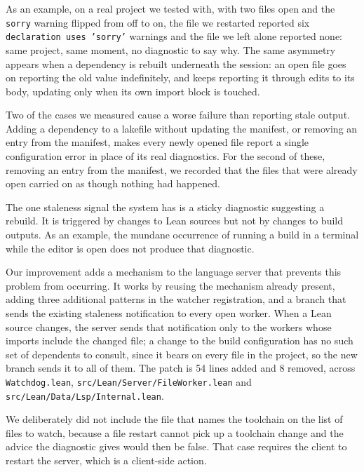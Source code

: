 \documentclass{article}
\newcommand{\Lean}{Lean\xspace}      %
\begin{document}
As an example, on a real project we tested with, with two files open and the \texttt{sorry} warning flipped from off to on, the file we restarted reported six \texttt{declaration uses 'sorry'} warnings and the file we left alone reported none: same project, same moment, no diagnostic to say why. The same asymmetry appears when a dependency is rebuilt underneath the session: an open file goes on reporting the old value indefinitely, and keeps reporting it through edits to its body, updating only when its own import block is touched.

Two of the cases we measured cause a worse failure than reporting stale output. Adding a dependency to a lakefile without updating the manifest, or removing an entry from the manifest, makes every newly opened file report a single configuration error in place of its real diagnostics. For the second of these, removing an entry from the manifest, we recorded that the files that were already open carried on as though nothing had happened.

The one staleness signal the system has is a sticky diagnostic suggesting a rebuild. It is triggered by changes to \Lean sources but not by changes to build outputs. As an example, the mundane occurrence of running a build in a terminal while the editor is open does not produce that diagnostic.

Our improvement adds a mechanism to the language server that prevents this problem from occurring. It works by reusing the mechanism already present, adding three additional patterns in the watcher registration, and a branch that sends the existing staleness notification to every open worker. When a \Lean source changes, the server sends that notification only to the workers whose imports include the changed file; a change to the build configuration has no such set of dependents to consult, since it bears on every file in the project, so the new branch sends it to all of them. The patch is 54 lines added and 8 removed, across \texttt{Watchdog.lean}, \texttt{src/Lean/Server/FileWorker.lean} and \texttt{src/Lean/Data/Lsp/Internal.lean}. 

We deliberately did not include the file that names the toolchain on the list of files to watch, because a file restart cannot pick up a toolchain change and the advice the diagnostic gives would then be false. That case requires the client to restart the server, which is a client-side action.
\end{document}
